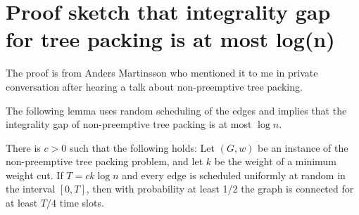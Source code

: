 \documentclass[runningheads]{llncs}
\numberwithin{equation}{section}
\begin{document}
\section{Proof sketch that integrality gap for tree packing is at most log(n)}
The proof is from Anders Martinsson who mentioned it to me in private conversation after hearing a talk about non-preemptive tree packing.

The following lemma uses random scheduling of the edges and implies that the integrality gap of non-preemptive tree packing is at most $\log n$.

\begin{lemma}
There is $c > 0$ such that the following holds: Let $(G, w)$ be an instance of the non-preemptive tree packing problem, and let $k$ be the weight of a minimum weight cut. If $T = ck\log n$ and every edge is scheduled uniformly at random in the interval $[0, T]$, then with probability at least 1/2 the graph is connected for at least $T/4$ time slots.
\end{lemma}
\end{document}
